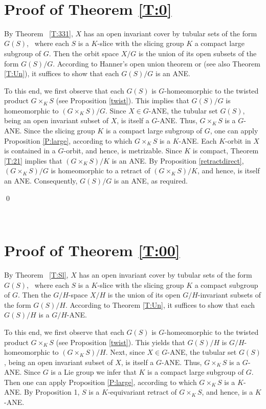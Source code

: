 \documentclass{amsart}
\begin{document}
   \
  
  \section{ Proof  of Theorem \ref{T:0}}
  
   By Theorem~ \ref{T:331}, $X$ has  an open invariant cover by tubular sets of the form $G(S)$, \  where each $S$ is a $K$-slice with  the slicing group $K$  a   compact large  subgroup of $ G$. Then the orbit space $X/G$ is the  union of its open subsets of the form $G(S)/G$. According to  
Hanner's open union theorem  \cite[Theorem 19.2]{ha:52} or \cite[Corollary 1.5]{dy:pp} (see also  
Theorem \ref{T:Un}), it suffices to show that each $G(S)/G$ is an {\rm ANE}.

To this end, we first observe that  each $G(S)$ is $G$-homeomorphic to the twisted product $G\times_{K} S$ (see Proposition \ref{twist}). This implies that $G(S)/G$ is homeomorphic to $(G\times_{K} S)/G$.
Since $X\in G$-{\rm ANE}, the tubular set  $G(S)$, being  an  open invariant subset of  $X$, is itself  a $G$-{\rm ANE}. Thus, $G\times_K S$ is a $G$-{\rm ANE}. Since the slicing group $K$  is a compact large subgroup of $G$, one can apply Proposition \ref{P:large}, according to which 
$G\times_{K} S$ is a $K$-{\rm ANE}. 
Each $K$-orbit in $X$ is contained in a $G$-orbit, and hence, is metrizable. Since $K$ is compact,  Theorem \ref{T:21} implies that
$(G\times_{K} S)/K$ is an {\rm ANE}. By Proposition \ref{retractdirect}, $(G\times_{K} S)/G$ is homeomorphic to a retract of $(G\times_{K} S)/K$, and hence, is itself  an {\rm ANE}. Consequently, $G(S)/G$ is an {\rm ANE},  as required.

\qed
  
  \
  
  
  \section{ Proof  of Theorem \ref{T:00}}
    


 By Theorem~ \ref{T:Sl},
 $X$ has  an open invariant cover by tubular sets of the form $G(S)$, \  where each $S$ is a $K$-slice  with the slicing group  $K$ a compact   subgroup of $G$.  Then the $G/H$-space $X/H$ is the  union of its open $G/H$-invariant subsets of the form $G(S)/H$. According to  Theorem \ref{T:Un}, it suffices to show that each $G(S)/H$ is a $G/H$-{\rm ANE}.

To this end, we first observe that  each $G(S)$ is $G$-homeomorphic to the twisted product $G\times_{K} S$ (see Proposition \ref{twist}). This yields that $G(S)/H$ is $G/H$-homeomorphic to 
$(G\times_ K S)/H$.
Next, since $X\in G$-{\rm ANE}, the tubular set  $G(S)$, being  an  open invariant subset of  $X$, is itself  a $G$-{\rm ANE}. Thus, $G\times_{K} S$ is a $G$-{\rm ANE}. Since $G$ is a Lie group we infer that $K$ is a compact large subgroup of $G$. Then one can apply Proposition \ref{P:large}, according to which 
$G\times_{K} S$ is a $K$-{\rm ANE}. 
By Proposition 1, $S$ is a $K$-equivariant retract of  $G\times_{K} S$, and hence, is  a $K$-{\rm ANE}.
\end{document}
